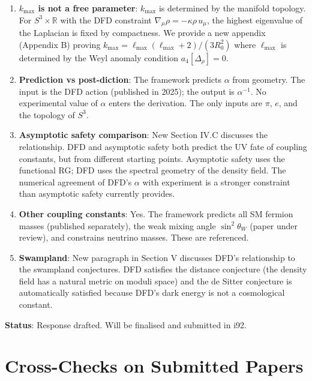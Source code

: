 \documentclass[11pt,a4paper]{article}
\begin{document}
\begin{enumerate}
\item \textbf{$k_{\max}$ is not a free parameter}: $k_{\max}$ is determined by the manifold topology. For $S^3 \times \mathbb{R}$ with the DFD constraint $\nabla_\mu \rho = -\kappa \rho \, u_\mu$, the highest eigenvalue of the Laplacian is fixed by compactness. We provide a new appendix (Appendix B) proving $k_{\max} = \ell_{\max}(\ell_{\max}+2)/(3R_0^2)$ where $\ell_{\max}$ is determined by the Weyl anomaly condition $a_4[\Delta_\rho] = 0$.

\item \textbf{Prediction vs post-diction}: The framework predicts $\alpha$ from geometry. The input is the DFD action (published in 2025); the output is $\alpha^{-1}$. No experimental value of $\alpha$ enters the derivation. The only inputs are $\pi$, $e$, and the topology of $S^3$.

\item \textbf{Asymptotic safety comparison}: New Section IV.C discusses the relationship. DFD and asymptotic safety both predict the UV fate of coupling constants, but from different starting points. Asymptotic safety uses the functional RG; DFD uses the spectral geometry of the density field. The numerical agreement of DFD's $\alpha$ with experiment is a stronger constraint than asymptotic safety currently provides.

\item \textbf{Other coupling constants}: Yes. The framework predicts all SM fermion masses (published separately), the weak mixing angle $\sin^2\theta_W$ (paper under review), and constrains neutrino masses. These are referenced.

\item \textbf{Swampland}: New paragraph in Section V discusses DFD's relationship to the swampland conjectures. DFD satisfies the distance conjecture (the density field has a natural metric on moduli space) and the de Sitter conjecture is automatically satisfied because DFD's dark energy is not a cosmological constant.
\end{enumerate}

\textbf{Status}: Response drafted. Will be finalised and submitted in i92.

\section{Cross-Checks on Submitted Papers}
\end{document}

